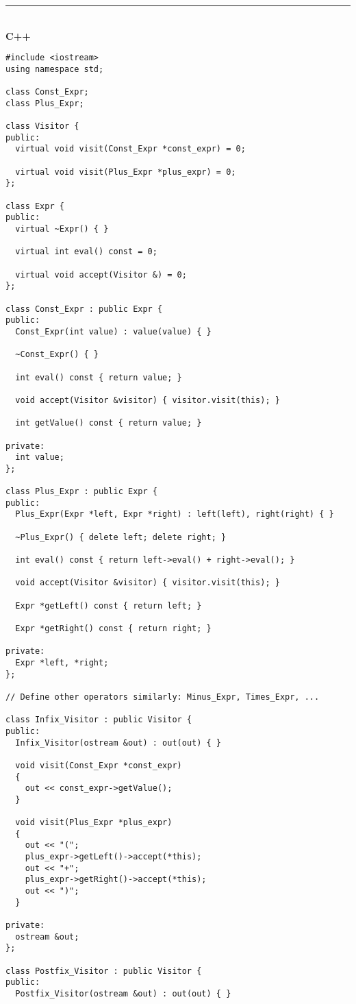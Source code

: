 \documentclass[11pt]{article}
\begin{document}
\newpage
\noindent\rule{\textwidth}{1pt}\\\textbf{C++}
\begin{verbatim}
#include <iostream>
using namespace std;

class Const_Expr;
class Plus_Expr;

class Visitor {
public:
  virtual void visit(Const_Expr *const_expr) = 0;

  virtual void visit(Plus_Expr *plus_expr) = 0;
};

class Expr {
public:
  virtual ~Expr() { }

  virtual int eval() const = 0;

  virtual void accept(Visitor &) = 0;
};

class Const_Expr : public Expr {
public:
  Const_Expr(int value) : value(value) { }

  ~Const_Expr() { }

  int eval() const { return value; }

  void accept(Visitor &visitor) { visitor.visit(this); }

  int getValue() const { return value; }

private:
  int value;
};

class Plus_Expr : public Expr {
public:
  Plus_Expr(Expr *left, Expr *right) : left(left), right(right) { }

  ~Plus_Expr() { delete left; delete right; }

  int eval() const { return left->eval() + right->eval(); }

  void accept(Visitor &visitor) { visitor.visit(this); }

  Expr *getLeft() const { return left; }

  Expr *getRight() const { return right; }

private:
  Expr *left, *right;
};

// Define other operators similarly: Minus_Expr, Times_Expr, ...

class Infix_Visitor : public Visitor {
public:
  Infix_Visitor(ostream &out) : out(out) { }

  void visit(Const_Expr *const_expr)
  {
    out << const_expr->getValue();
  }

  void visit(Plus_Expr *plus_expr)
  {
    out << "(";
    plus_expr->getLeft()->accept(*this);
    out << "+";
    plus_expr->getRight()->accept(*this);
    out << ")";
  }

private:
  ostream &out;
};

class Postfix_Visitor : public Visitor {
public:
  Postfix_Visitor(ostream &out) : out(out) { }


\end{verbatim}
\end{document}
